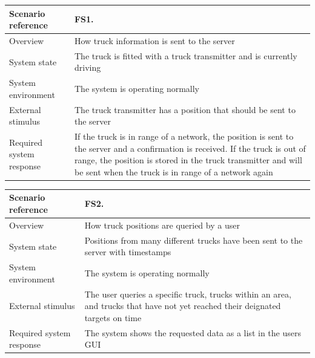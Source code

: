 \documentclass[a4paper,11pt]{report}
\begin{document}
\begin{center}
  \begin{tabular}[h!]{| >{\columncolor{gray}}p{} | p{} |}
    \hline
    Scenario reference & FS1. \\
    \hline
    Overview & How truck information is sent to the server \\
    \hline
    System state & The truck is fitted with a truck transmitter and is currently driving\\
    \hline
    System environment & The system is operating normally\\
    \hline
    External stimulus & The truck transmitter has a position that should be sent to the server\\
    \hline
    Required system response & If the truck is in range of a network, the position is sent to the server and a confirmation is received. If the truck is out of range, the position is stored in the truck transmitter and will be sent when the truck is in range of a network again \\
    \hline
  \end{tabular}
\end{center}

\begin{center}
  \begin{tabular}[h!]{| >{\columncolor{gray}}p{} | p{} |}
    \hline
    Scenario reference & FS2. \\
    \hline
    Overview & How truck positions are queried by a user \\
    \hline
    System state & Positions from many different trucks have been sent to the server with timestamps\\
    \hline
    System environment & The system is operating normally\\
    \hline
    External stimulus & The user queries a specific truck, trucks within an area, and trucks that have not yet reached their deignated targets on time\\
    \hline
    Required system response & The system shows the requested data as a list in the users GUI \\
    \hline
  \end{tabular}
\end{center}
\end{document}
